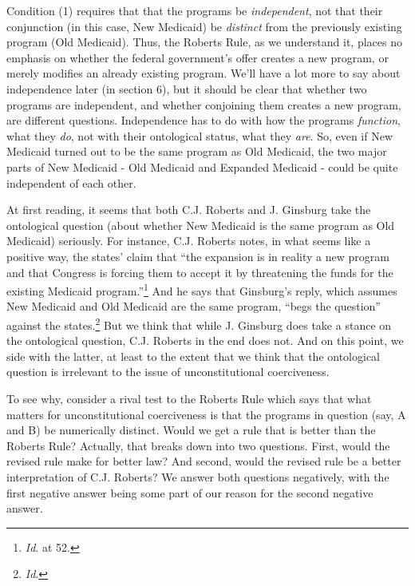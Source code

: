 \documentclass[
  11pt,
  letterpaper,
  DIV=11,
  numbers=noendperiod,
  twoside]{scrartcl}
\begin{document}
Condition (1) requires that that the programs be \emph{independent}, not
that their conjunction (in this case, New Medicaid) be \emph{distinct}
from the previously existing program (Old Medicaid). Thus, the Roberts
Rule, as we understand it, places no emphasis on whether the federal
government's offer creates a new program, or merely modifies an already
existing program. We'll have a lot more to say about independence later
(in section 6), but it should be clear that whether two programs are
independent, and whether conjoining them creates a new program, are
different questions. Independence has to do with how the programs
\emph{function}, what they \emph{do}, not with their ontological status,
what they \emph{are}. So, even if New Medicaid turned out to be the same
program as Old Medicaid, the two major parts of New Medicaid - Old
Medicaid and Expanded Medicaid - could be quite independent of each
other.

At first reading, it seems that both C.J. Roberts and J. Ginsburg take
the ontological question (about whether New Medicaid is the same program
as Old Medicaid) seriously. For instance, C.J. Roberts notes, in what
seems like a positive way, the states' claim that ``the expansion is in
reality a new program and that Congress is forcing them to accept it by
threatening the funds for the existing Medicaid program.''\footnote{\emph{Id}.
  at 52.} And he says that Ginsburg's reply, which assumes New Medicaid
and Old Medicaid are the same program, ``begs the question'' against the
states.\footnote{\emph{Id}.} But we think that while J. Ginsburg does
take a stance on the ontological question, C.J. Roberts in the end does
not. And on this point, we side with the latter, at least to the extent
that we think that the ontological question is irrelevant to the issue
of unconstitutional coerciveness.

To see why, consider a rival test to the Roberts Rule which says that
what matters for unconstitutional coerciveness is that the programs in
question (say, A and B) be numerically distinct. Would we get a rule
that is better than the Roberts Rule? Actually, that breaks down into
two questions. First, would the revised rule make for better law? And
second, would the revised rule be a better interpretation of C.J.
Roberts? We answer both questions negatively, with the first negative
answer being some part of our reason for the second negative answer.
\end{document}
